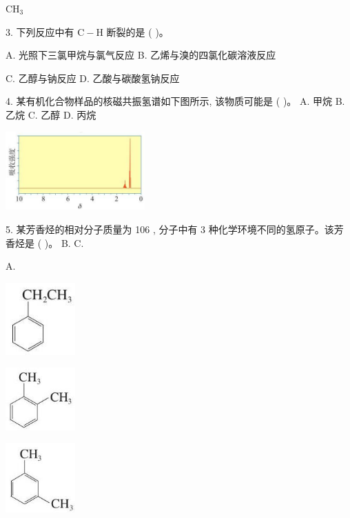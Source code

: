 \documentclass[10pt]{article}
\begin{document}
\({\mathrm{{CH}}}_{3}\)

3. 下列反应中有 \(\mathrm{C} - \mathrm{H}\) 断裂的是 ( )。

A. 光照下三氯甲烷与氯气反应 B. 乙烯与溴的四氯化碳溶液反应

C. 乙醇与钠反应 D. 乙酸与碳酸氢钠反应

4. 某有机化合物样品的核磁共振氢谱如下图所示, 该物质可能是 ( )。 A. 甲烷 B. 乙烷 C. 乙醇 D. 丙烷

\begin{center}
\includegraphics[max width=0.4\textwidth]{images/0190efc5-b58a-7c43-bfb0-e0a030df9cfd_30_635053.jpg}
\end{center}

5. 某芳香烃的相对分子质量为 106 , 分子中有 3 种化学环境不同的氢原子。该芳香烃是 ( )。 B. C.

A.

\begin{center}
\includegraphics[max width=0.2\textwidth]{images/0190efc5-b58a-7c43-bfb0-e0a030df9cfd_31_629945.jpg}
\end{center}

\begin{center}
\includegraphics[max width=0.2\textwidth]{images/0190efc5-b58a-7c43-bfb0-e0a030df9cfd_31_817335.jpg}
\end{center}

\begin{center}
\includegraphics[max width=0.2\textwidth]{images/0190efc5-b58a-7c43-bfb0-e0a030df9cfd_31_320025.jpg}
\end{center}
\end{document}
